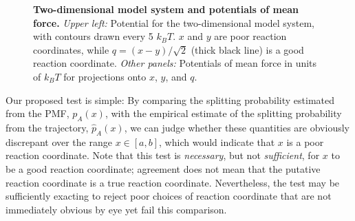 \documentclass[aps,prl,twocolumn,superscriptaddress,floatfix]{revtex4-1}
\begin{document}
\begin{figure}[tb]
\caption{\label{figure:model-pmfs} {\bf Two-dimensional model system and potentials of mean force.}
\emph{Upper left:} Potential for the two-dimensional model system, with contours drawn every 5 $k_B T$.
$x$ and $y$ are poor reaction coordinates, while $q = (x - y) / \sqrt{2}$ (thick black line) is a good reaction coordinate.
\emph{Other panels:} Potentials of mean force in units of $k_B T$ for projections onto $x$, $y$, and $q$.} 
\end{figure}

Our proposed test is simple:
By comparing the splitting probability estimated from the PMF, $p_A(x)$, with the empirical estimate of the splitting probability from the trajectory, $\hat{p}_A(x)$, we can judge whether these quantities are obviously discrepant over the range $x \in [a, b]$, which would indicate that $x$ is a poor reaction coordinate.
Note that this test is \emph{necessary}, but not \emph{sufficient}, for $x$ to be a good reaction coordinate; agreement does not mean that the putative reaction coordinate is a true reaction coordinate.
Nevertheless, the test may be sufficiently exacting to reject poor choices of reaction coordinate that are not immediately obvious by eye yet fail this comparison.
\end{document}
